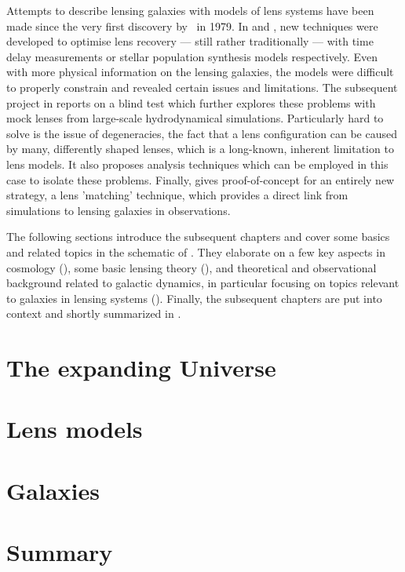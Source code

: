 Attempts to describe lensing galaxies with models of lens systems have been made
since the very first discovery by~ in 1979.  In
 and , new techniques were developed to optimise
lens recovery --- still rather traditionally --- with time delay measurements or
stellar population synthesis models respectively.  Even with more physical
information on the lensing galaxies, the models were difficult to properly
constrain and revealed certain issues and limitations.  The subsequent project
in  reports on a blind test which further explores these problems
with mock lenses from large-scale hydrodynamical simulations.  Particularly hard
to solve is the issue of degeneracies, the fact that a lens configuration can be
caused by many, differently shaped lenses, which is a long-known, inherent
limitation to lens models.  It also proposes analysis techniques which can be
employed in this case to isolate these problems.  Finally,  gives
proof-of-concept for an entirely new strategy, a lens 'matching' technique,
which provides a direct link from simulations to lensing galaxies in
observations.

The following sections introduce the subsequent chapters and cover some basics
and related topics in the schematic of .  They elaborate on a
few key aspects in cosmology (), some basic lensing theory
(), and theoretical and observational background related to
galactic dynamics, in particular focusing on topics relevant to galaxies in
lensing systems ().  Finally, the subsequent chapters are put
into context and shortly summarized in .

\section{The expanding Universe}

\section{Lens models}

\section{Galaxies}

\section{Summary}

